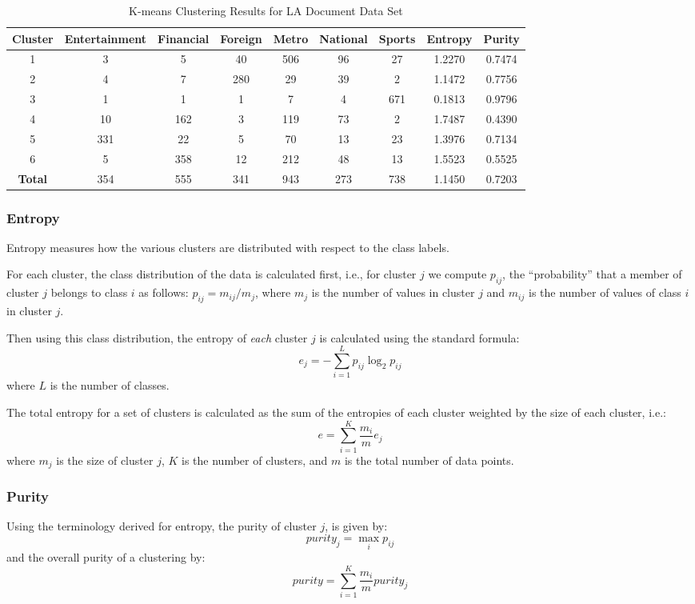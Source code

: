 \begin{table}[htbp]
\centering
\caption{K-means Clustering Results for LA Document Data Set}
\label{tab:05/kmeans_results}
\begin{tabular}{|c|c|c|c|c|c|c|c|c|}
\hline
\textbf{Cluster} & \textbf{Entertainment} & \textbf{Financial} & \textbf{Foreign} & \textbf{Metro} & \textbf{National} & \textbf{Sports} & \textbf{Entropy} & \textbf{Purity} \\
\hline
1 & 3 & 5 & 40 & 506 & 96 & 27 & 1.2270 & 0.7474 \\
\hline
2 & 4 & 7 & 280 & 29 & 39 & 2 & 1.1472 & 0.7756 \\
\hline
3 & 1 & 1 & 1 & 7 & 4 & 671 & 0.1813 & 0.9796 \\
\hline
4 & 10 & 162 & 3 & 119 & 73 & 2 & 1.7487 & 0.4390 \\
\hline
5 & 331 & 22 & 5 & 70 & 13 & 23 & 1.3976 & 0.7134 \\
\hline
6 & 5 & 358 & 12 & 212 & 48 & 13 & 1.5523 & 0.5525 \\
\hline
\textbf{Total} & 354 & 555 & 341 & 943 & 273 & 738 & 1.1450 & 0.7203 \\
\hline
\end{tabular}
\end{table}

\subsubsection{Entropy}
Entropy measures how the various clusters are distributed with respect to the class labels.

For each cluster, the class distribution of the data is calculated first, i.e., for cluster $j$ we compute $p_{ij}$, the ``probability'' that a member of cluster $j$ belongs to class $i$ as follows: $p_{ij} = m_{ij}/m_j$, where $m_j$ is the number of values in cluster $j$ and $m_{ij}$ is the number of values of class $i$ in cluster $j$. 

Then using this class distribution, the entropy of \textit{each} cluster $j$ is calculated using the standard formula:
\[
e_j = -\sum_{i=1}^{L} p_{ij} \log_2 p_{ij}
\]
where $L$ is the number of classes. 

The total entropy for a set of clusters is calculated as the sum of the entropies of each cluster weighted by the size of each cluster, i.e.:
\[
e = \sum_{i=1}^{K} \frac{m_i}{m} e_j
\]
where $m_j$ is the size of cluster $j$, $K$ is the number of clusters, and $m$ is the total number of data points.

\subsubsection{Purity}
Using the terminology derived for entropy, the purity of cluster $j$, is given by:
\[
purity_j = \max_i p_{ij}
\]
and the overall purity of a clustering by:
\[
purity = \sum_{i=1}^{K} \frac{m_i}{m} purity_j
\]



